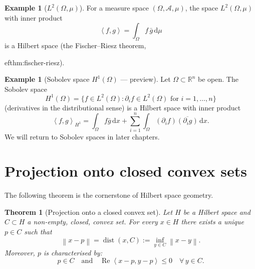 \documentclass[a4paper,12pt]{book}
\DeclareMathOperator{\dist}{dist}
\newcommand{\R}{\mathbb{R}}
\newcommand{\dd}{\mathrm{d}}
\newcommand{\norm}[1]{\left\| #1 \right\|}
\newcommand{\inner}[2]{\left\langle #1, #2 \right\rangle}
\theoremstyle{definition}
\newtheorem{example}[definition]{Example}
\theoremstyle{plain}
\newtheorem{theorem}[definition]{Theorem}
\theoremstyle{remark}
\begin{document}
\begin{example}[$L^2(\Omega,\mu)$]
\label{ex:L2}
For a measure space $(\Omega,\mathcal{A},\mu)$, the space
$L^2(\Omega,\mu)$ with inner product
\[
  \inner{f}{g} = \int_\Omega f\,\bar{g}\,\dd\mu
\]
is a Hilbert space (the Fischer--Riesz theorem,

ef{thm:fischer-riesz}).
\end{example}

\begin{example}[Sobolev space $H^1(\Omega)$ --- preview]
\label{ex:sobolev-preview}
Let $\Omega\subset\R^n$ be open.  The Sobolev space
\[
  H^1(\Omega) = \bigl\{f\in L^2(\Omega) :
  \partial_i f\in L^2(\Omega) \text{ for }i=1,\dots,n\bigr\}
\]
(derivatives in the distributional sense) is a Hilbert space with inner
product
\[
  \inner{f}{g}_{H^1}
  = \int_\Omega f\bar{g}\,\dd x
    + \sum_{i=1}^n\int_\Omega (\partial_i f)\overline{(\partial_i g)}\,\dd x.
\]
We will return to Sobolev spaces in later chapters.
\end{example}

\section{Projection onto closed convex sets}
\label{sec:projection-convex}

The following theorem is the cornerstone of Hilbert space geometry.

\begin{theorem}[Projection onto a closed convex set]
\label{thm:projection-convex}
Let $H$ be a Hilbert space and $C\subset H$ a non-empty, closed, convex
set.  For every $x\in H$ there exists a unique $p\in C$ such that
\[
  \norm{x-p} = \dist(x,C) := \inf_{y\in C}\norm{x-y}.
\]
Moreover, $p$ is characterised by:
\begin{equation}\label{eq:projection-char}
  p\in C \quad\text{and}\quad
  \operatorname{Re}\inner{x-p}{y-p}\le 0 \quad\forall\,y\in C.
\end{equation}
\end{theorem}
\end{document}
